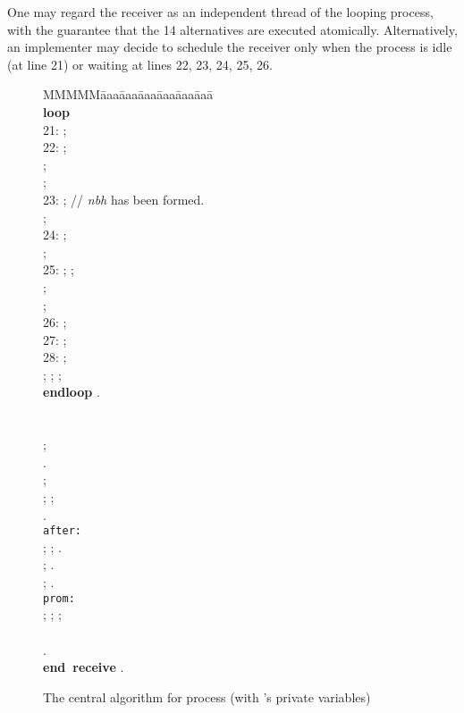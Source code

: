 \documentclass[10pt]{article} \usepackage[english]{babel}
\newenvironment{tab}{\begin{tabbing}
MMMMM\=aaa\=aaa\=aaa\=aaa\=aaa\=aaa\= \kill}{\end{tabbing}}
\def\S #1/{\mbox {\textsl{#1}}}
\def\B #1/{\mbox {\textbf{#1}}}
\def\T #1/{\mbox {\texttt{#1}}}
\begin{document}
One may regard the receiver as an independent thread of the looping
process, with the guarantee that the 14 alternatives are executed
atomically.  Alternatively, an implementer may decide to schedule the
receiver only when the process is idle (at line 21) or waiting at
lines 22, 23, 24, 25, 26.

\begin{figure}[t]
\begin{tab}
  \>  \+\\
  \B loop/\\
  21: \>\>  ;\\
  22: \>\>  ;\\
  \>\>  ;\\
  \>\>  ;\\
  23: \>\>  ;
  // \S nbh/ has been formed.\\
  \>\>  ;\\
  24: \>\>  ;\\
  \>\>  ;\\
  25: \>\>  ;  ;\\
  \>\>  ;\\
  \>\>  ;\\
  26: \>\>  ;\\
  27: \>\>  ;\\
  28: \>\>  ;\\
  \>\>  ;
   ;  ;\\
  \B endloop/ .
  \\
  \\
  \+ \\

  \>  ;\\
  \>  .\\
  
  \>  ;\\
  \>  ;   ; \\
  \>  .\\

   \> \T after:/ \quad \\
  \>  ; 
   ;  . \\

  \>  ;
   . \\

  \>  ;  .\\
 
   \> \T prom:/ \quad  \\
  \>  ;  ;
   ;\\
  \> \\
  \>  .\-\\
  \B end receive/ .
\end{tab}
\caption{The central algorithm for process  (with 's private
  variables)}\label{fifo}
\end{figure}
\end{document}
